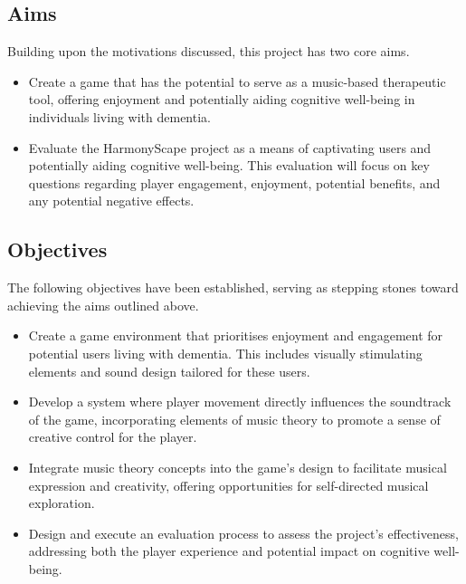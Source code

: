 \documentclass{l4proj}
\begin{document}
\subsection{Aims}

Building upon the motivations discussed, this project has two core aims.

\begin{itemize}
    \item Create a game that has the potential to serve as a music-based therapeutic tool, offering enjoyment and potentially aiding cognitive well-being in individuals living with dementia.
    \item Evaluate the HarmonyScape project as a means of captivating users and potentially aiding cognitive well-being. This evaluation will focus on key questions regarding player engagement, enjoyment, potential benefits, and any potential negative effects.
\end{itemize}

\subsection{Objectives}

The following objectives have been established, serving as stepping stones toward achieving the aims outlined above.

\begin{itemize}
    \item Create a game environment that prioritises enjoyment and engagement for potential users living with dementia. This includes visually stimulating elements and sound design tailored for these users.
    \item Develop a system where player movement directly influences the soundtrack of the game, incorporating elements of music theory to promote a sense of creative control for the player.
    \item Integrate music theory concepts into the game's design to facilitate musical expression and creativity, offering opportunities for self-directed musical exploration.
    \item Design and execute an evaluation process to assess the project's effectiveness, addressing both the player experience and potential impact on cognitive well-being.
\end{itemize}

\end{document}
